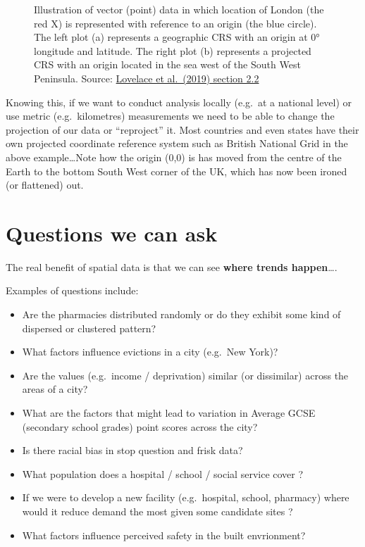 \documentclass[
  letterpaper,
]{scrbook}
\begin{document}
\begin{figure}
\begin{minipage}[t]{0.50\linewidth}
{{}

}

\end{minipage}%

\caption{\label{fig-elephants}Illustration of vector (point) data in
which location of London (the red X) is represented with reference to an
origin (the blue circle). The left plot (a) represents a geographic CRS
with an origin at 0° longitude and latitude. The right plot (b)
represents a projected CRS with an origin located in the sea west of the
South West Peninsula. Source:
\href{https://geocompr.robinlovelace.net/spatial-class.html}{Lovelace et
al.~(2019) section 2.2}}

\end{figure}

Knowing this, if we want to conduct analysis locally (e.g.~at a national
level) or use metric (e.g.~kilometres) measurements we need to be able
to change the projection of our data or ``reproject'' it. Most countries
and even states have their own projected coordinate reference system
such as British National Grid in the above example\ldots Note how the
origin (0,0) is has moved from the centre of the Earth to the bottom
South West corner of the UK, which has now been ironed (or flattened)
out.

\hypertarget{questions-we-can-ask}{%
\section{Questions we can ask}\label{questions-we-can-ask}}

The real benefit of spatial data is that we can see \textbf{where trends
happen}\ldots.

Examples of questions include:

\begin{itemize}
\item
  Are the pharmacies distributed randomly or do they exhibit some kind
  of dispersed or clustered pattern?
\item
  What factors influence evictions in a city (e.g.~New York)?
\item
  Are the values (e.g.~income / deprivation) similar (or dissimilar)
  across the areas of a city?
\item
  What are the factors that might lead to variation in Average GCSE
  (secondary school grades) point scores across the city?
\item
  Is there racial bias in stop question and frisk data?
\item
  What population does a hospital / school / social service cover ?
\item
  If we were to develop a new facility (e.g.~hospital, school, pharmacy)
  where would it reduce demand the most given some candidate sites ?
\item
  What factors influence perceived safety in the built envrionment?
\end{itemize}
\end{document}
